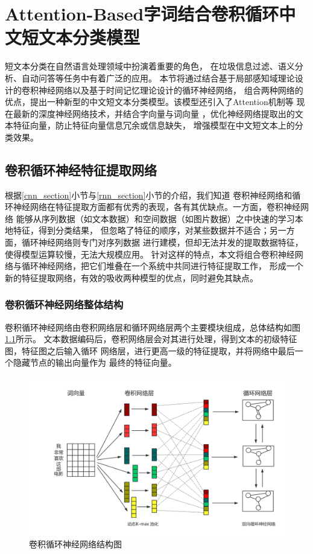\chapter{Attention-Based字词结合卷积循环中文短文本分类模型}
\label{4_section}
短文本分类在自然语言处理领域中扮演着重要的角色，
在垃圾信息过滤、语义分析、自动问答等任务中有着广泛的应用。
本节将通过结合基于局部感知域理论设计的卷积神经网络以及基于时间记忆理论设计的循环神经网络，
组合两种网络的优点，提出一种新型的中文短文本分类模型。该模型还引入了Attention机制等
现在最新的深度神经网络技术，并结合字向量与词向量
，优化神经网络提取出的文本特征向量，防止特征向量信息冗余或信息缺失，
增强模型在中文短文本上的分类效果。
\section{卷积循环神经特征提取网络}
\label{CLSTM_section}
根据\ref{cnn_section}小节与\ref{rnn_section}小节的介绍，我们知道
卷积神经网络和循环神经网络在特征提取方面都有优秀的表现，各有其优缺点。一方面，卷积神经网络
能够从序列数据（如文本数据）和空间数据（如图片数据）之中快速的学习本地特征，得到分类结果，
但忽略了特征的顺序，对某些数据并不适合；另一方面，循环神经网络则专门对序列数据
进行建模，但却无法并发的提取数据特征，使得模型运算较慢，无法大规模应用。
针对这样的特点，本文将组合卷积神经网络与循环神经网络，把它们堆叠在一个系统中共同进行特征提取工作，
形成一个新的特征提取网络，有效的吸收两种模型的优点，同时避免其缺点。
\subsection{卷积循环神经网络整体结构}
卷积循环神经网络由卷积网络层和循环网络层两个主要模块组成，总体结构如图\ref{CLSTM}所示。
文本数据编码后，卷积网络层会对其进行处理，得到文本的初级特征图，特征图之后输入循环
网络层，进行更高一级的特征提取，并将网络中最后一个隐藏节点的输出向量作为
最终的特征向量。
\begin{figure}[h]
    \includegraphics[scale=0.4]{picture/CLSTM.png}
    \caption{卷积循环神经网络结构图}
    \label{CLSTM}
\end{figure}
